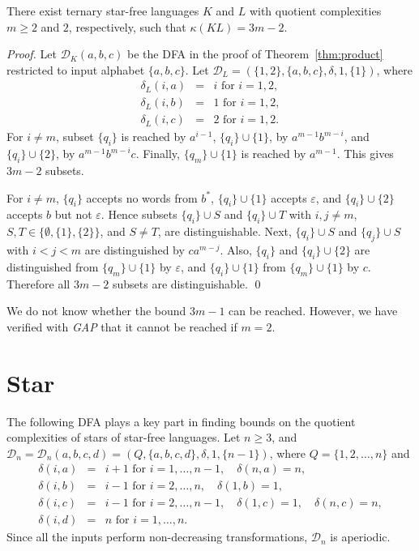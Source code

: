 \documentclass{llncs}
\renewcommand{\ge}{\geqslant}
\newcommand{\eps}{\varepsilon}
\newcommand{\emp}{\emptyset}
\newcommand{\cD}{{\mathcal D}}
\begin{document}
\begin{theorem}
\label{thm:m2}
There exist ternary star-free languages $K$ and $L$ with quotient complexities $m\ge 2$ and $2$, respectively, such that $\kappa(KL)=3m-2$.
\end{theorem}
\begin{proof}
Let $\cD_K(a,b,c)$ be the DFA in the proof of Theorem~\ref{thm:product} restricted to input alphabet $\{a,b,c\}$.
Let $\cD_L=(\{1,2\},\{a,b,c\},\delta,1,\{1\})$, where
\begin{eqnarray*}
\delta_L(i,a)&=&i \text{ for } i=1,2,\\
\delta_L(i,b)&=& 1 \text{ for } i=1,2,\\
\delta_L(i,c)&=&2 \text{ for } i=1,2.
\end{eqnarray*}
For $i\neq m$, subset  $\{q_i\}$ is reached by $a^{i-1}$,  
$\{q_i\}\cup \{1\}$, by $a^{m-1}b^{m-i}$, 
and $\{q_i\}\cup \{2\}$, by $a^{m-1}b^{m-i}c$. 
Finally, $\{q_m\}\cup \{1\}$ is reached by $a^{m-1}$.
This gives $3m-2$ subsets.

For $i\neq m$,   $\{q_i\}$ accepts no words from $b^*$, $\{q_i\}\cup \{1\}$ accepts $\eps$, and $\{q_i\}\cup \{2\}$ accepts $b$ but not $\eps$. 
Hence subsets $\{q_i\}\cup S$ and $\{q_i\}\cup T$ with $i,j\neq m$,
$S,T \in \{\emp, \{1\},\{2\} \}$, and $S\neq T$, are distinguishable. 
Next, $\{q_i\}\cup S$ and $\{q_j\}\cup S$ with $i<j<m$ are distinguished by $ca^{m-j}$.
Also, $\{q_i\}$ and $\{q_i\}\cup \{2\}$ are distinguished from $\{q_m\}\cup \{1\}$
by $\eps$, and $\{q_i\}\cup \{1\}$ from $\{q_m\}\cup \{1\}$ by $c$. Therefore all $3m-2$ subsets are distinguishable.
\qed
\end{proof}
We do not know whether the bound $3m-1$ can be reached. However, we have verified with \emph{GAP} that it cannot be reached if $m=2$.

\section{Star}
\label{sec:star}

The following DFA plays a key part in finding bounds on the quotient complexities of stars of star-free languages.
Let $n\ge 3$, and $\cD_n=\cD_n(a,b,c,d)=(Q,\{a,b,c,d\},\delta,1, \{n-1\})$, where 
$Q=\{1,2,\ldots, n\}$ and 
\begin{eqnarray*}
\delta(i,a)&=&{i+1} \text{ for } i=1,\ldots,n-1,\quad  \delta(n,a)=n,\\
\delta(i,b)&=&{i-1} \text{ for } i=2,\ldots,n,\quad  \delta(1,b)=1,\\
\delta(i,c)&=&{i-1} \text{ for } i=2,\ldots,n-1, \quad \delta(1,c)=1, \quad \delta(n,c)=n,\\
\delta(i,d)&=&n \text{ for } i=1,\ldots,n.
\end{eqnarray*}
Since all the inputs perform non-decreasing transformations, $\cD_n$ is 
aperiodic. 
\end{document}
